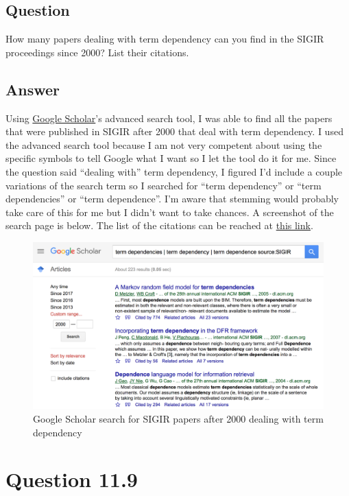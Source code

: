 \documentclass[10pt,letterpaper,bibliography=totoc]{scrartcl}
\begin{document}
\subsection {Question}
How many papers dealing with term dependency can you find in the SIGIR proceedings since 2000? List their citations.

\subsection{Answer}
Using \href{https://scholar.google.com/}{Google Scholar}'s advanced search tool, I was able to find all the papers that were published in SIGIR after 2000 that deal with term dependency. I used the advanced search tool because I am not very competent about using the specific symbols to tell Google what I want so I let the tool do it for me. Since the question said ``dealing with'' term dependency, I figured I'd include a couple variations of the search term so I searched for ``term dependency'' or ``term dependencies'' or ``term dependence''. I'm aware that stemming would probably take care of this for me but I didn't want to take chances. A screenshot of the search page is below. The list of the citations can be reached at \href{https://scholar.google.com/scholar?as_vis=0&q=term+dependencies+%7C+term+dependency+%7C+term+dependence+source:SIGIR&hl=en&as_sdt=2c47&as_ylo=2000}{this link}.

\begin{figure}[h!]
\centering
\label{fig:scholar-search}
\includegraphics[scale=.5]{scholar-search.png}
\caption{Google Scholar search for SIGIR papers after 2000 dealing with term dependency}
\end{figure}

\section{Question 11.9}
\end{document}
